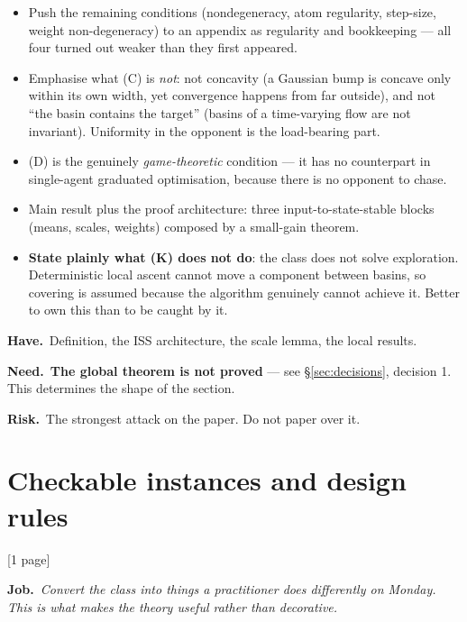 \documentclass[11pt]{article}
\newcommand{\job}[1]{\par\smallskip\noindent
  \textcolor{jobc}{\textbf{Job.}}\ \emph{#1}\par\smallskip}
\newcommand{\have}[1]{\par\noindent
  \textcolor{havec}{\textbf{Have.}}\ #1\par}
\newcommand{\need}[1]{\par\noindent
  \textcolor{needc}{\textbf{Need.}}\ #1\par}
\newcommand{\risk}[1]{\par\noindent
  \textcolor{riskc}{\textbf{Risk.}}\ #1\par\smallskip}
\newcommand{\budget}[1]{\hfill{\small\textsf{[#1]}}}
\theoremstyle{definition}
\theoremstyle{remark}
\begin{document}
\begin{itemize}[leftmargin=1.2em]
\item Push the remaining conditions (nondegeneracy, atom regularity, step-size,
  weight non-degeneracy) to an appendix as regularity and bookkeeping --- all four
  turned out weaker than they first appeared.
\item Emphasise what (C) is \emph{not}: not concavity (a Gaussian bump is concave
  only within its own width, yet convergence happens from far outside), and not
  ``the basin contains the target'' (basins of a time-varying flow are not
  invariant). Uniformity in the opponent is the load-bearing part.
\item (D) is the genuinely \emph{game-theoretic} condition --- it has no
  counterpart in single-agent graduated optimisation, because there is no
  opponent to chase.
\item Main result plus the proof architecture: three input-to-state-stable blocks
  (means, scales, weights) composed by a small-gain theorem.
\item \textbf{State plainly what (K) does not do}: the class does not solve
  exploration. Deterministic local ascent cannot move a component between
  basins, so covering is assumed because the algorithm genuinely cannot achieve
  it. Better to own this than to be caught by it.
\end{itemize}

\have{Definition, the ISS architecture, the scale lemma, the local results.}

\need{\textbf{The global theorem is not proved} --- see
\S\ref{sec:decisions}, decision 1. This determines the shape of the section.}

\risk{The strongest attack on the paper. Do not paper over it.}

\section{Checkable instances and design rules}\label{sec:check}
\budget{1 page}

\job{Convert the class into things a practitioner does differently on Monday.
This is what makes the theory useful rather than decorative.}
\end{document}
